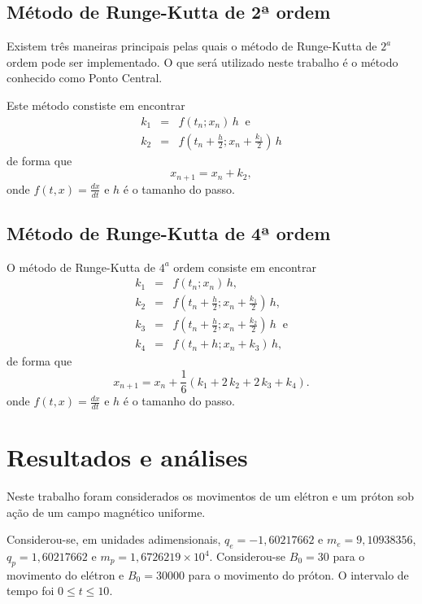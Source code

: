 \documentclass[brazilian, 12pt, a4paper, final]{article}
\begin{document}
\begin{multicols*}{2}
\subsection{Método de Runge-Kutta de 2ª ordem}
Existem três maneiras principais pelas quais o método de Runge-Kutta de $2^{a}$ ordem pode ser implementado. O que será utilizado neste trabalho é o método conhecido como Ponto Central.

Este método constiste em encontrar
\begin{eqnarray}
  k_1&=&f(t_n;x_n)\,h \;\;\mathrm{e} \\
  k_2&=&f\left(t_n+\frac{h}{2}; x_n+\frac{k_1}{2}\right)\,h 
\end{eqnarray}
\noindent
de forma que
\begin{equation}
 x_{n+1}=x_{n}+k_2,
\end{equation}
\noindent
onde $f(t,x)=\frac{dx}{dt}$ e $h$ é o tamanho do passo.

\subsection{Método de Runge-Kutta de 4ª ordem}
O método de Runge-Kutta de $4^{a}$ ordem consiste em encontrar
\begin{eqnarray}
 k_1&=&f(t_n;x_n)\,h, \\
 k_2&=&f\left(t_n+\frac{h}{2}; x_n +\frac{k_1}{2}\right)\,h, \\
 k_3&=&f\left(t_n+\frac{h}{2}; x_n +\frac{k_2}{2}\right)\,h \;\;\mathrm{ e} \\
 k_4&=&f\left(t_n+h; x_n + k_3\right)\,h,
\end{eqnarray}
\noindent
de forma que
\begin{equation}
 x_{n+1}=x_{n}+\frac{1}{6}\left(k_1+2\,k_2+2\,k_3+k_4\right). 
\end{equation}
\noindent
onde $f(t,x)=\frac{dx}{dt}$ e $h$ é o tamanho do passo.

\section{Resultados e análises}
Neste trabalho foram considerados os movimentos de um elétron e um próton sob ação de um campo magnético uniforme. 

Considerou-se, em unidades adimensionais, $q_e=-1,60217662$ e $m_e=9,10938356$, $q_p=1,60217662$ e $m_p=1,6726219\times 10^{4}$. Considerou-se $B_0=30$ para o movimento do elétron e $B_0=30000$ para o movimento do próton. O intervalo de tempo foi $0\le t\le10$.


\end{multicols*}
\end{document}
